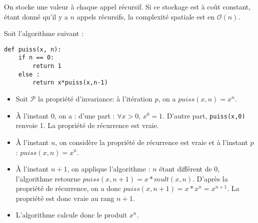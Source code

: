 \begin{multicols}{2}
\ifprof
\begin{corrige}
On stocke une valeur à chaque appel récursif. Si ce stockage est à coût constant, étant donné qu'il y a $n$ appels récursifs, la complexité spatiale est en $\mathcal{O}(n)$.
\end{corrige}
\else
\fi


\setcounter{numques}{0}




\ifprof
\begin{corrige}
Soit l'algorithme suivant : 

\begin{py}
\begin{lstlisting}
def puiss(x, n):
    if n == 0:
        return 1
    else :
        return x*puiss(x,n-1)
\end{lstlisting}
\end{py}
\end{corrige}
\else
\fi




\ifprof
\begin{corrige}
\begin{itemize}
\item Soit $\mathcal{P}$ la propriété d'invariance: à l'itération $p$, on a $puiss(x,n)=x^n$. 
\item À l'instant 0, on a : d'une part : $\forall x>0$, $x^0 = 1$. D'autre part, \texttt{puiss(x,0)} renvoie 1. La 
propriété de récurrence est vraie. 
\item À l'instant $n$, on considère la propriété de récurrence est vraie et à l'instant $p$ : $puiss(x,n)=x^n$.
\item À l'instant $n+1$, on applique l'algorithme : $n$ étant différent de 0, l'algorithme retourne 
$puiss(x,n+1)=x*mult(x,n)$. D'après la propriété de récurrence, on a donc $puiss(x,n+1)=x*x^n=x^{n+1} $. La propriété 
est donc vraie au rang $n+1$.
\item L'algorithme calcule donc le produit $x^n$.
\end{itemize}   
\end{corrige}
\else
\fi


\end{multicols}
